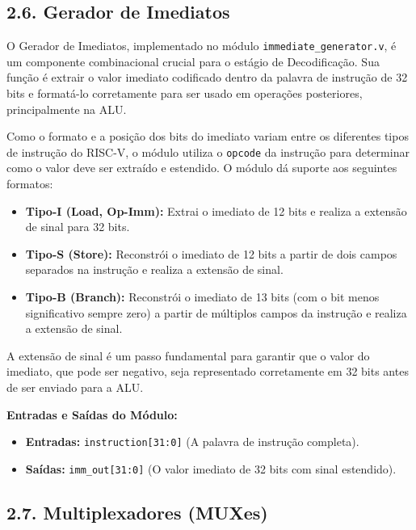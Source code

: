 \documentclass[12pt, a4paper]{article}
\begin{document}
\subsection*{2.6. Gerador de Imediatos}

O Gerador de Imediatos, implementado no módulo \texttt{immediate\_generator.v}, é um componente combinacional crucial para o estágio de Decodificação. Sua função é extrair o valor imediato codificado dentro da palavra de instrução de 32 bits e formatá-lo corretamente para ser usado em operações posteriores, principalmente na ALU.

Como o formato e a posição dos bits do imediato variam entre os diferentes tipos de instrução do RISC-V, o módulo utiliza o \texttt{opcode} da instrução para determinar como o valor deve ser extraído e estendido. O módulo dá suporte aos seguintes formatos:
\begin{itemize}
    \item \textbf{Tipo-I (Load, Op-Imm):} Extrai o imediato de 12 bits e realiza a extensão de sinal para 32 bits.
    \item \textbf{Tipo-S (Store):} Reconstrói o imediato de 12 bits a partir de dois campos separados na instrução e realiza a extensão de sinal.
    \item \textbf{Tipo-B (Branch):} Reconstrói o imediato de 13 bits (com o bit menos significativo sempre zero) a partir de múltiplos campos da instrução e realiza a extensão de sinal.
\end{itemize}

A extensão de sinal é um passo fundamental para garantir que o valor do imediato, que pode ser negativo, seja representado corretamente em 32 bits antes de ser enviado para a ALU.

\vspace{0.5cm}
\textbf{Entradas e Saídas do Módulo:}
\begin{itemize}
    \item \textbf{Entradas:} \texttt{instruction[31:0]} (A palavra de instrução completa).
    \item \textbf{Saídas:} \texttt{imm\_out[31:0]} (O valor imediato de 32 bits com sinal estendido).
\end{itemize}

\subsection*{2.7. Multiplexadores (MUXes)}
\end{document}
